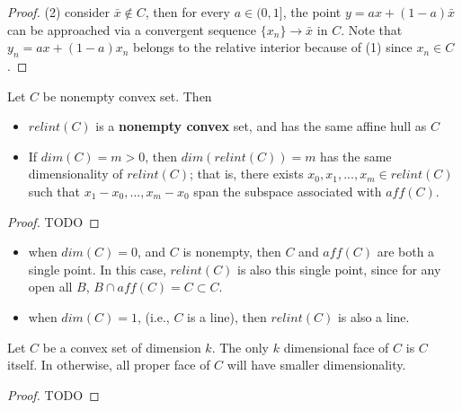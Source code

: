\begin{refsection}
\begin{proof}
(2) consider $\bar{x}\notin C$, then for every $a\in (0,1]$, the point $y = ax + (1-a)\bar{x}$ can be approached via a convergent sequence $\{x_n\} \to \bar{x}$ in $C$. Note that $y_n = ax + (1-a)x_n$ belongs to the relative interior because of (1) since $x_n\in C$.
\end{proof}



\begin{theorem}\cite[24]{bertsekas2009convex}
Let $C$ be nonempty convex set. Then
\begin{itemize}
    \item $relint(C)$ is a \textbf{nonempty convex} set, and has the same affine hull as $C$
    \item If $dim(C) = m > 0 $, then $dim(relint(C)) = m$ has the same dimensionality of $relint(C)$; that is, there exists $x_0,x_1,...,x_m \in relint(C)$ such that $x_1-x_0,...,x_m-x_0$ span the subspace associated with $aff(C)$.  
\end{itemize}
\end{theorem}
\begin{proof}
TODO
\end{proof}


\begin{remark}[interpretation]\hfill
\begin{itemize}
    \item when $dim(C)=0$, and $C$ is nonempty, then $C$ and $aff(C)$ are both a single point. In this case, $relint(C)$ is also this single point, since for any open all $B$, $B\cap aff(C) = C\subset C$.
    \item when $dim(C)=1$, (i.e., $C$ is a line), then $relint(C)$ is also a line.
\end{itemize}
\end{remark}









\begin{lemma}
	Let $C$ be a convex set of dimension $k$. The only $k$ dimensional face of $C$ is $C$ itself. In otherwise, all proper face of $C$ will have smaller dimensionality.
\end{lemma}
\begin{proof}
	TODO
\end{proof}



\end{refsection}
